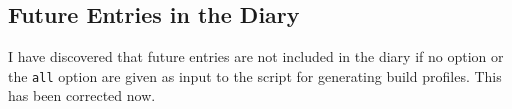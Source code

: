 \subsection{Future Entries in the Diary}
\label{task:20141022_jkn0}
I have discovered that future entries are not included in the diary if no option or the {\tt all} option are given as input to the script for generating build profiles. This has been corrected now. 

